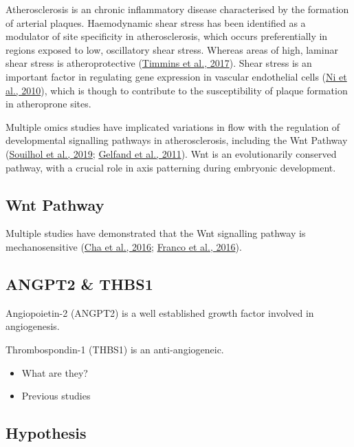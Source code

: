 \documentclass[
  12pt,
]{article}
\begin{document}
Atherosclerosis is an chronic inflammatory disease characterised by the formation of arterial plaques. Haemodynamic shear stress has been identified as a modulator of site specificity in atherosclerosis, which occurs preferentially in regions exposed to low, oscillatory shear stress. Whereas areas of high, laminar shear stress is atheroprotective (\protect\hyperlink{ref-timmins2017}{Timmins et al., 2017}). Shear stress is an important factor in regulating gene expression in vascular endothelial cells (\protect\hyperlink{ref-Ni2010}{Ni et al., 2010}), which is though to contribute to the susceptibility of plaque formation in atheroprone sites.

Multiple omics studies have implicated variations in flow with the regulation of developmental signalling pathways in atherosclerosis, including the Wnt Pathway (\protect\hyperlink{ref-Souilhol2020}{Souilhol et al., 2019}; \protect\hyperlink{ref-Gelfand2011}{Gelfand et al., 2011}). Wnt is an evolutionarily conserved pathway, with a crucial role in axis patterning during embryonic development.

\hypertarget{wnt-pathway}{%
\subsection{Wnt Pathway}\label{wnt-pathway}}

Multiple studies have demonstrated that the Wnt signalling pathway is mechanosensitive (\protect\hyperlink{ref-Cha2016}{Cha et al., 2016}; \protect\hyperlink{ref-Franco2016}{Franco et al., 2016}).

\hypertarget{angpt2-thbs1}{%
\subsection{ANGPT2 \& THBS1}\label{angpt2-thbs1}}

Angiopoietin-2 (ANGPT2) is a well established growth factor involved in angiogenesis.

Thrombospondin-1 (THBS1) is an anti-angiogeneic.

\begin{itemize}
\item
  What are they?
\item
  Previous studies
\end{itemize}

\hypertarget{hypothesis}{%
\subsection{Hypothesis}\label{hypothesis}}
\end{document}
